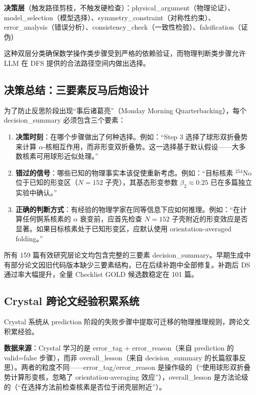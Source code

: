 \documentclass[12pt,a4paper]{article}
\begin{document}
\textbf{决策层}（触发路径剪枝，不触发硬检查）：physical\_argument（物理论证）、model\_selection（模型选择）、symmetry\_constraint（对称性约束）、error\_analysis（错误分析）、consistency\_check（一致性检验）、falsification（证伪）

这种双层分类确保数学操作类步骤受到严格的依赖验证，而物理判断类步骤允许 LLM 在 DFS 提供的合法路径空间内做出选择。

\subsection{决策总结：三要素反马后炮设计}

为了防止反思阶段出现“事后诸葛亮”（Monday Morning Quarterbacking），每个 decision\_summary 必须包含三个要素：

\begin{enumerate}
\item \textbf{决策时刻}：在哪个步骤做出了何种选择。例如：“Step 3 选择了球形双折叠势来计算 $\alpha$-核相互作用，而非形变双折叠势。这一选择基于默认假设——大多数核素可用球形近似处理。”

\item \textbf{错过的信号}：哪些已知的物理事实本该促使重新考虑。例如：“目标核素 $^{254}$No 位于已知的形变区（$N=152$ 子壳），其基态形变参数 $\beta_2 \approx 0.25$ 已在多篇独立实验中确认。”

\item \textbf{正确的判断方式}：有经验的物理学家在同等信息下应如何推理。例如：“在计算任何锕系核素的 $\alpha$ 衰变前，应首先检查 $N=152$ 子壳附近的形变效应是否显著。如果目标核素处于已知形变区，应默认使用 orientation-averaged folding。”
\end{enumerate}

所有 159 篇有效研究层论文均包含完整的三要素 decision\_summary。早期生成中有部分论文因旧代码版本缺少三要素结构，已在后续补跑中全部修复。补跑后 DS 通过率大幅提升，全量 Checklist GOLD 候选数稳定在 101 篇。

\subsection{Crystal 跨论文经验积累系统}

Crystal 系统从 prediction 阶段的失败步骤中提取可迁移的物理推理规则，跨论文积累经验。

\textbf{数据来源}：Crystal 学习的是 error\_tag + error\_reason（来自 prediction 的 valid=false 步骤），而非 overall\_lesson（来自 decision\_summary 的长篇叙事反思）。两者的粒度不同——error\_tag/error\_reason 是操作级的（“使用球形双折叠势计算形变核，忽略了 orientation-averaging 效应”），overall\_lesson 是方法论级的（“在选择方法前检查核素是否位于闭壳层附近”）。
\end{document}
